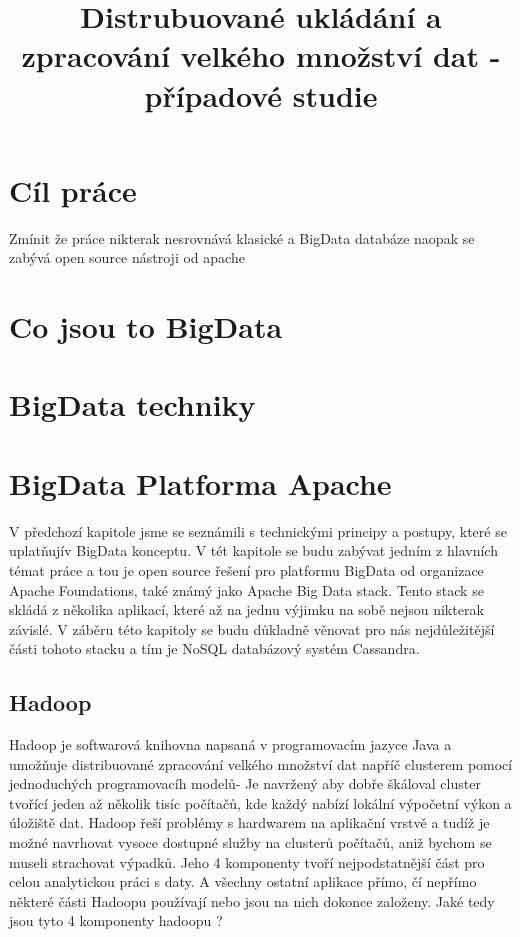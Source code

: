 \documentclass[thesis=M,czech]{FITthesis}[2012/06/26]
\title{Distrubuované ukládání a zpracování velkého množství dat - případové studie}
\begin{document}
	

\begin{introduction}
\end{introduction}



\chapter{Cíl práce}
Zmínit že práce nikterak nesrovnává klasické a BigData databáze naopak se zabývá open source nástroji od apache



\chapter{Co jsou to BigData}




\chapter{BigData techniky}



\chapter{BigData Platforma Apache}



V předchozí kapitole jsme se seznámili s technickými principy a postupy, které se uplatňujív BigData konceptu. V tét kapitole se budu zabývat jedním z hlavních témat práce a tou je open source řešení pro platformu BigData od organizace Apache Foundations, také známý jako Apache Big Data stack. Tento stack se skládá z několika aplikací, které až na jednu výjimku na sobě nejsou nikterak závislé. V záběru této kapitoly se budu důkladně věnovat pro nás nejdůležitější části tohoto stacku a tím je NoSQL databázový systém Cassandra.

\section{Hadoop}




Hadoop je softwarová knihovna napsaná v programovacím jazyce Java a umožňuje distribuované zpracování velkého množství dat napříč clusterem pomocí jednoduchých programovacíh modelů- Je navržený aby dobře škáloval cluster tvořící jeden až několik tisíc počítačů, kde každý nabízí lokální výpočetní výkon a úložiště dat. Hadoop řeší problémy s hardwarem na aplikační vrstvě a tudíž je možné navrhovat vysoce dostupné služby na clusterů počítačů, aniž bychom se museli strachovat výpadků. Jeho 4 komponenty tvoří nejpodstatnější část pro celou analytickou práci s  daty. A všechny ostatní aplikace přímo, čí nepřímo některé části Hadoopu používají nebo jsou na nich dokonce založeny. Jaké tedy jsou tyto 4 komponenty hadoopu ?
\end{document}
